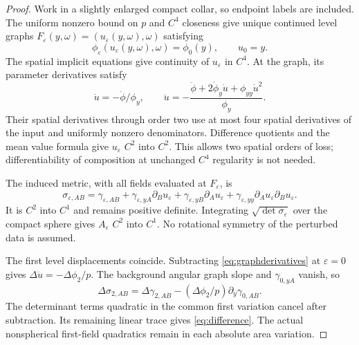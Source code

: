 \documentclass[11pt]{article}
\newcommand{\eps}{\varepsilon}
\begin{document}
\begin{proof}
Work in a slightly enlarged compact collar, so endpoint labels are included.
The uniform nonzero bound on $p$ and $C^4$ closeness give unique continued
level graphs $F_\eps(y,\omega)=(u_\eps(y,\omega),\omega)$ satisfying
\begin{equation}
 \phi_\eps(u_\eps(y,\omega),\omega)=\phi_0(y),\qquad u_0=y.
 \label{eq:graph}
\end{equation}
The spatial implicit equations give continuity of $u_\eps$ in $C^4$.
At the graph, its parameter derivatives satisfy
\begin{equation}
 \dot u=-\dot\phi/\phi_y,\qquad
 \ddot u=-\frac{\ddot\phi+2\dot\phi_y\dot u+\phi_{yy}\dot u^2}{\phi_y}.
 \label{eq:graphderivatives}
\end{equation}
Their spatial derivatives through order two use at most four spatial
derivatives of the input and uniformly nonzero denominators. Difference
quotients and the mean value formula give $u_\eps$ $C^2$ into $C^2$.
This allows two spatial orders of loss; differentiability of composition
at unchanged $C^4$ regularity is not needed.

The induced metric, with all fields evaluated at $F_\eps$, is
\begin{equation}
 \sigma_{\eps,AB}=\gamma_{\eps,AB}
 +\gamma_{\eps,yA}\partial_Bu_\eps
 +\gamma_{\eps,yB}\partial_Au_\eps
 +\gamma_{\eps,yy}\partial_Au_\eps\partial_Bu_\eps.
 \label{eq:induced}
\end{equation}
It is $C^2$ into $C^1$ and remains positive definite. Integrating
$\sqrt{\det\sigma_\eps}$ over the compact sphere gives $A_\eps$ $C^2$
into $C^1$. No rotational symmetry of the perturbed data is assumed.

The first level displacements coincide. Subtracting
\eqref{eq:graphderivatives} at $\eps=0$ gives
$\Delta\ddot u=-\Delta\phi_2/p$. The background angular graph slope and
$\gamma_{0,yA}$ vanish, so
\begin{equation}
 \Delta\sigma_{2,AB}=\Delta\gamma_{2,AB}
                 -(\Delta\phi_2/p)\partial_y\gamma_{0,AB}.
 \label{eq:sigmadifference}
\end{equation}
The determinant terms quadratic in the common first variation cancel
after subtraction. Its remaining linear trace gives
\eqref{eq:difference}. The actual nonspherical first-field quadratics
remain in each absolute area variation.
\end{proof}
\end{document}
